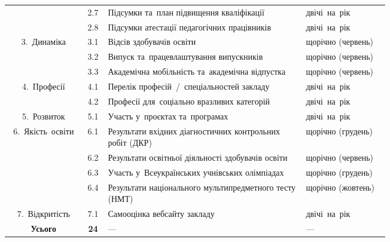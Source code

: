 \begin{table}[htbp]
\begin{tabular}{|c|c|p{0.52\linewidth}|p{0.22\linewidth}|}
\cline{2-4}
 & 2.7 & Підсумки та~план підвищення кваліфікації & двічі~на~рік \\
\cline{2-4}
 & 2.8 & Підсумки атестації педагогічних працівників & двічі~на~рік \\
\hline
\multirow{3}{*}{3.~Динаміка} & 3.1 & Відсів здобувачів освіти & щорічно (червень) \\
\cline{2-4}
 & 3.2 & Випуск та~працевлаштування випускників & щорічно (червень) \\
\cline{2-4}
 & 3.3 & Академічна мобільність та~академічна відпустка & щорічно (червень) \\
\hline
\multirow{2}{*}{4.~Професії} & 4.1 & Перелік професій~/~спеціальностей закладу & двічі~на~рік \\
\cline{2-4}
 & 4.2 & Професії для~соціально вразливих категорій & двічі~на~рік \\
\hline
5.~Розвиток & 5.1 & Участь у~проєктах та~програмах & двічі~на~рік \\
\hline
\multirow{4}{*}{6.~Якість~освіти} & 6.1 & Результати вхідних діагностичних контрольних робіт (ДКР) & щорічно (грудень) \\
\cline{2-4}
 & 6.2 & Результати освітньої діяльності здобувачів освіти & щорічно (червень) \\
\cline{2-4}
 & 6.3 & Участь у~Всеукраїнських учнівських олімпіадах & щорічно (грудень) \\
\cline{2-4}
 & 6.4 & Результати національного мультипредметного тесту (НМТ) & щорічно (жовтень) \\
\hline
7.~Відкритість & 7.1 & Самооцінка вебсайту закладу & двічі~на~рік \\
\hline
\textbf{Усього} & \textbf{24} & ---  & --- \\
\hline
\end{tabular}
\end{table}

